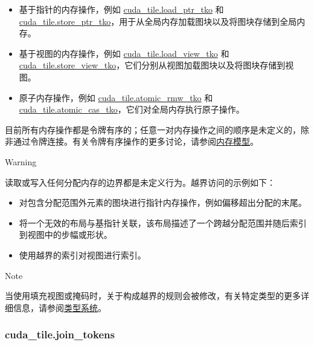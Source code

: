 \documentclass{article}
\begin{document}
\begin{itemize}
\item 基于指针的内存操作，例如 \href{https://docs.nvidia.com/cuda/tile-ir/latest/sections/operations.html#op-cuda-tile-load-ptr-tko}{cuda\_tile.load\_ptr\_tko} 和 \href{https://docs.nvidia.com/cuda/tile-ir/latest/sections/operations.html#op-cuda-tile-store-ptr-tko}{cuda\_tile.store\_ptr\_tko}，用于从全局内存加载图块以及将图块存储到全局内存。
\item 基于视图的内存操作，例如 \href{https://docs.nvidia.com/cuda/tile-ir/latest/sections/operations.html#op-cuda-tile-load-view-tko}{cuda\_tile.load\_view\_tko} 和 \href{https://docs.nvidia.com/cuda/tile-ir/latest/sections/operations.html#op-cuda-tile-store-view-tko}{cuda\_tile.store\_view\_tko}，它们分别从视图加载图块以及将图块存储到视图。
\item 原子内存操作，例如 \href{https://docs.nvidia.com/cuda/tile-ir/latest/sections/operations.html#op-cuda-tile-atomic-rmw-tko}{cuda\_tile.atomic\_rmw\_tko} 和 \href{https://docs.nvidia.com/cuda/tile-ir/latest/sections/operations.html#op-cuda-tile-atomic-cas-tko}{cuda\_tile.atomic\_cas\_tko}，它们对全局内存执行原子操作。

\end{itemize}
目前所有内存操作都是令牌有序的；任意一对内存操作之间的顺序是未定义的，除非通过令牌连接。有关令牌有序操作的更多讨论，请参阅\href{https://docs.nvidia.com/cuda/tile-ir/latest/sections/memory_model.html#section-memory-model}{内存模型}。


Warning


读取或写入任何分配内存的边界都是未定义行为。越界访问的示例如下：

\begin{itemize}
\item 对包含分配范围外元素的图块进行指针内存操作，例如偏移超出分配的末尾。
\item 将一个无效的布局与基指针关联，该布局描述了一个跨越分配范围并随后索引到视图中的步幅或形状。
\item 使用越界的索引对视图进行索引。


\end{itemize}
Note


当使用填充视图或掩码时，关于构成越界的规则会被修改，有关特定类型的更多详细信息，请参阅\href{https://docs.nvidia.com/cuda/tile-ir/latest/sections/types.html#section-types}{类型系统}。



\subsubsection{cuda\_tile.join\_tokens}
\end{document}
